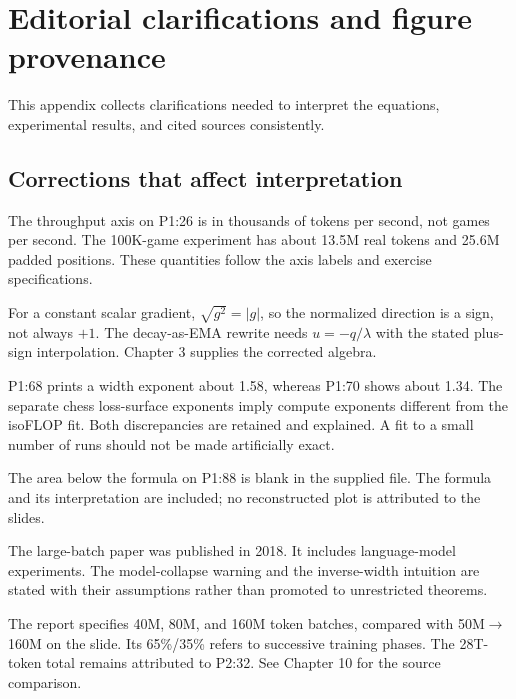 \chapter{Editorial clarifications and figure provenance}
\label{app:editorial}

This appendix collects clarifications needed to interpret the equations, experimental results, and cited sources consistently.

\section{Corrections that affect interpretation}
\begin{description}[style=nextline]
\item[Tokens, games, and padded positions.]
The throughput axis on P1:26 is in thousands of tokens per second, not games per second. The 100K-game experiment has about 13.5M real tokens and 25.6M padded positions. These quantities follow the axis labels and exercise specifications.
\item[Adam's normalized update.]
For a constant scalar gradient, $\sqrt{g^2}=|g|$, so the normalized direction is a sign, not always $+1$. The decay-as-EMA rewrite needs $u=-q/\lambda$ with the stated plus-sign interpolation. Chapter 3 supplies the corrected algebra.
\item[Empirical fits are not universal constants.]
P1:68 prints a width exponent about 1.58, whereas P1:70 shows about 1.34. The separate chess loss-surface exponents imply compute exponents different from the isoFLOP fit. Both discrepancies are retained and explained. A fit to a small number of runs should not be made artificially exact.
\item[Absent image content.]
The area below the formula on P1:88 is blank in the supplied file. The formula and its interpretation are included; no reconstructed plot is attributed to the slides.
\item[Dates and scope of paper claims.]
The large-batch paper was published in 2018. It includes language-model experiments. The model-collapse warning and the inverse-width intuition are stated with their assumptions rather than promoted to unrestricted theorems.
\item[Mistral slide shorthand.]
The report specifies 40M, 80M, and 160M token batches, compared with 50M$\to$160M on the slide. Its 65\%/35\% refers to successive training phases. The 28T-token total remains attributed to P2:32. See Chapter 10 for the source comparison.
\end{description}

